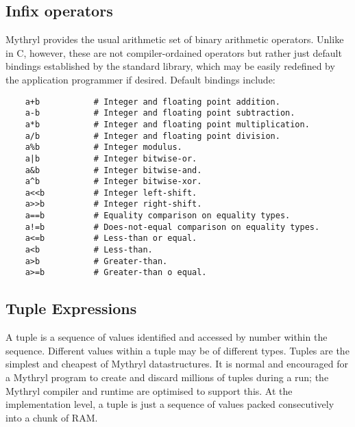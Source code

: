 \cutend*

\subsection{Infix operators}
\label{section:ref:expressions:infix-operators}

Mythryl provides the usual arithmetic set of binary arithmetic operators. 
Unlike in C, however, these are not compiler-ordained operators but rather 
just default bindings established by the standard library, which may be 
easily redefined by the application programmer if desired.  Default 
bindings include:

\begin{verbatim}
    a+b           # Integer and floating point addition.
    a-b           # Integer and floating point subtraction.
    a*b           # Integer and floating point multiplication.
    a/b           # Integer and floating point division.
    a%b           # Integer modulus.
    a|b           # Integer bitwise-or.
    a&b           # Integer bitwise-and.
    a^b           # Integer bitwise-xor.
    a<<b          # Integer left-shift.
    a>>b          # Integer right-shift.
    a==b          # Equality comparison on equality types.
    a!=b          # Does-not-equal comparison on equality types.
    a<=b          # Less-than or equal.
    a<b           # Less-than.
    a>b           # Greater-than.
    a>=b          # Greater-than o equal.
\end{verbatim}

\cutend*

\subsection{Tuple Expressions}
\label{section:ref:expressions:tuple-expressions}

A tuple is a sequence of values identified and accessed by number 
within the sequence.  Different values within a tuple may be of 
different types.  Tuples are the simplest and cheapest of Mythryl 
datastructures.  It is normal and encouraged for a Mythryl program 
to create and discard millions of tuples during a run;  the Mythryl 
compiler and runtime are optimised to support this.  At the 
implementation level, a tuple is just a sequence of values packed 
consecutively into a chunk of {\sc RAM}.

